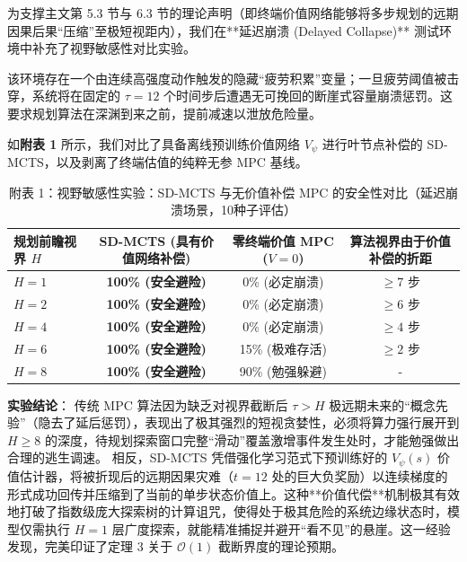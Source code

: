 \documentclass[UTF8]{ctexart}
\begin{document}
为支撑主文第 5.3 节与 6.3 节的理论声明（即终端价值网络能够将多步规划的远期因果后果“压缩”至极短视距内），我们在**延迟崩溃 (Delayed Collapse)** 测试环境中补充了视野敏感性对比实验。

该环境存在一个由连续高强度动作触发的隐藏“疲劳积累”变量；一旦疲劳阈值被击穿，系统将在固定的 $\tau=12$ 个时间步后遭遇无可挽回的断崖式容量崩溃惩罚。这要求规划算法在深渊到来之前，提前减速以泄放危险量。

如\textbf{附表 1} 所示，我们对比了具备离线预训练价值网络 $V_\psi$ 进行叶节点补偿的 SD-MCTS，以及剥离了终端估值的纯粹无参 MPC 基线。

\begin{table}[ht]
\centering
\caption{附表 1：视野敏感性实验：SD-MCTS 与无价值补偿 MPC 的安全性对比（延迟崩溃场景，10种子评估）}
\begin{tabular}{l c c c}
\toprule
规划前瞻视界 $H$ & SD-MCTS (具有价值网络补偿) & 零终端价值 MPC ($V=0$) & 算法视界由于价值补偿的折距 \\
\midrule
$H=1$ & \textbf{100\% (安全避险)} & 0\% (必定崩溃)  & $\ge 7$ 步 \\
$H=2$ & \textbf{100\% (安全避险)} & 0\% (必定崩溃)  & $\ge 6$ 步 \\
$H=4$ & \textbf{100\% (安全避险)} & 0\% (必定崩溃)  & $\ge 4$ 步 \\
$H=6$ & \textbf{100\% (安全避险)} & 15\% (极难存活) & $\ge 2$ 步 \\
$H=8$ & \textbf{100\% (安全避险)} & 90\% (勉强躲避) & - \\
\bottomrule
\end{tabular}
\end{table}

\textbf{实验结论}：
传统 MPC 算法因为缺乏对视界截断后 $\tau > H$ 极远期未来的“概念先验”（隐去了延后惩罚），表现出了极其强烈的短视贪婪性，必须将算力强行展开到 $H \ge 8$ 的深度，待规划探索窗口完整“滑动”覆盖激增事件发生处时，才能勉强做出合理的逃生调速。
相反，SD-MCTS 凭借强化学习范式下预训练好的 $V_\psi(s)$ 价值估计器，将被折现后的远期因果灾难（$t=12$ 处的巨大负奖励）以连续梯度的形式成功回传并压缩到了当前的单步状态价值上。这种**价值代偿**机制极其有效地打破了指数级庞大探索树的计算诅咒，使得处于极其危险的系统边缘状态时，模型仅需执行 $H=1$ 层广度探索，就能精准捕捉并避开“看不见”的悬崖。这一经验发现，完美印证了定理 3 关于 $\mathcal{O}(1)$ 截断界度的理论预期。
\end{document}
